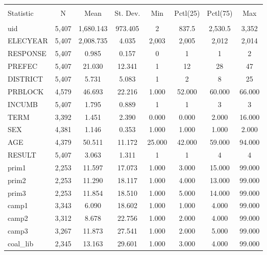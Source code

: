 
\begin{table}[!htbp] \centering 
  \caption{} 
  \label{} 
\begin{tabular}{@{\extracolsep{5pt}}lccccccc} 
\\[-1.8ex]\hline 
\hline \\[-1.8ex] 
Statistic & \multicolumn{1}{c}{N} & \multicolumn{1}{c}{Mean} & \multicolumn{1}{c}{St. Dev.} & \multicolumn{1}{c}{Min} & \multicolumn{1}{c}{Pctl(25)} & \multicolumn{1}{c}{Pctl(75)} & \multicolumn{1}{c}{Max} \\ 
\hline \\[-1.8ex] 
uid & 5,407 & 1,680.143 & 973.405 & 2 & 837.5 & 2,530.5 & 3,352 \\ 
ELECYEAR & 5,407 & 2,008.735 & 4.035 & 2,003 & 2,005 & 2,012 & 2,014 \\ 
RESPONSE & 5,407 & 0.985 & 0.157 & 0 & 1 & 1 & 2 \\ 
PREFEC & 5,407 & 21.030 & 12.341 & 1 & 12 & 28 & 47 \\ 
DISTRICT & 5,407 & 5.731 & 5.083 & 1 & 2 & 8 & 25 \\ 
PRBLOCK & 4,579 & 46.693 & 22.216 & 1.000 & 52.000 & 60.000 & 66.000 \\ 
INCUMB & 5,407 & 1.795 & 0.889 & 1 & 1 & 3 & 3 \\ 
TERM & 3,392 & 1.451 & 2.390 & 0.000 & 0.000 & 2.000 & 16.000 \\ 
SEX & 4,381 & 1.146 & 0.353 & 1.000 & 1.000 & 1.000 & 2.000 \\ 
AGE & 4,379 & 50.511 & 11.172 & 25.000 & 42.000 & 59.000 & 94.000 \\ 
RESULT & 5,407 & 3.063 & 1.311 & 1 & 1 & 4 & 4 \\ 
prim1 & 2,253 & 11.597 & 17.073 & 1.000 & 3.000 & 15.000 & 99.000 \\ 
prim2 & 2,253 & 11.290 & 18.117 & 1.000 & 4.000 & 13.000 & 99.000 \\ 
prim3 & 2,253 & 11.854 & 18.510 & 1.000 & 5.000 & 14.000 & 99.000 \\ 
camp1 & 3,343 & 6.090 & 18.602 & 1.000 & 1.000 & 4.000 & 99.000 \\ 
camp2 & 3,312 & 8.678 & 22.756 & 1.000 & 2.000 & 4.000 & 99.000 \\ 
camp3 & 3,267 & 11.873 & 27.541 & 1.000 & 2.000 & 5.000 & 99.000 \\ 
coal\_lib & 2,345 & 13.163 & 29.601 & 1.000 & 3.000 & 4.000 & 99.000 \\ 

\end{tabular}
\end{table}

